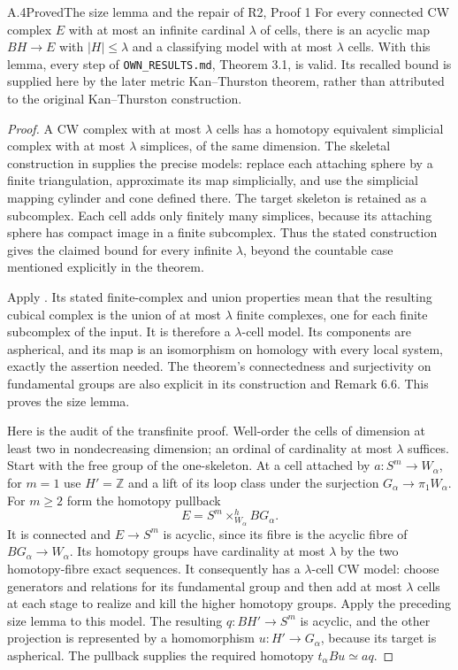 \begin{claim}{A.4}{Proved}{The size lemma and the repair of R2, Proof 1}
For every connected CW complex $E$ with at most an infinite cardinal
$\lambda$ of cells, there is an acyclic map $BH\to E$ with
$|H|\leq\lambda$ and a classifying model with at most $\lambda$ cells.
With this lemma, every step of \texttt{OWN\_RESULTS.md}, Theorem 3.1,
is valid. Its recalled bound is supplied here by the later metric
Kan--Thurston theorem, rather than attributed to the original
Kan--Thurston construction.
\end{claim}
\begin{proof}
A CW complex with at most $\lambda$ cells has a homotopy equivalent
simplicial complex with at most $\lambda$ simplices, of the same
dimension. The skeletal construction in
\cite[Theorem 2C.5]{A_Hatcher2002} supplies the precise models: replace
each attaching sphere by a finite triangulation, approximate its map
simplicially, and use the simplicial mapping cylinder and cone defined
there. The target skeleton is retained as a subcomplex. Each cell adds
only finitely many simplices, because its attaching sphere has compact
image in a finite subcomplex. Thus the stated construction gives the
claimed bound for every infinite $\lambda$, beyond the countable case
mentioned explicitly in the theorem.

Apply \cite[Theorem A]{A_Leary2013}. Its stated finite-complex and union
properties mean that the resulting cubical complex is the union of at
most $\lambda$ finite complexes, one for each finite subcomplex of the
input. It is therefore a $\lambda$-cell model. Its components are
aspherical, and its map is an isomorphism on homology with every local
system, exactly the assertion needed. The theorem's connectedness
and surjectivity on fundamental groups are also explicit in its
construction and Remark 6.6. This proves the size lemma.

Here is the audit of the transfinite proof. Well-order the cells of
dimension at least two in nondecreasing dimension; an ordinal of
cardinality at most $\lambda$ suffices. Start with the free group of
the one-skeleton. At a cell attached by $a:S^m\to W_\alpha$, for
$m=1$ use $H'=\mathbb Z$ and a lift of its loop class under the
surjection $G_\alpha\to\pi_1W_\alpha$. For $m\geq2$ form the
homotopy pullback
\[
 E=S^m\mathop{\times}^{h}_{W_\alpha}BG_\alpha.
\]
It is connected and $E\to S^m$ is acyclic, since its fibre is the
acyclic fibre of $BG_\alpha\to W_\alpha$. Its homotopy groups have
cardinality at most $\lambda$ by the two homotopy-fibre exact sequences.
It consequently has a $\lambda$-cell CW model: choose generators and
relations for its fundamental group and then add at most $\lambda$
cells at each stage to realize and kill the higher homotopy groups.
Apply the preceding size lemma to this model. The resulting
$q:BH'\to S^m$ is acyclic, and the other projection is represented by
a homomorphism $u:H'\to G_\alpha$, because its target is aspherical.
The pullback supplies the required homotopy
$t_\alpha Bu\simeq aq$.


\end{proof}
